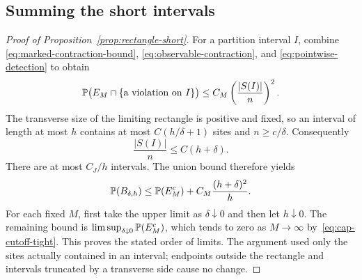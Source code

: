 \subsection{Summing the short intervals}

\begin{proof}[Proof of Proposition~\ref{prop:rectangle-short}]
For a partition interval $I$, combine
\eqref{eq:marked-contraction-bound},
\eqref{eq:observable-contraction}, and
\eqref{eq:pointwise-detection} to obtain
\[
 \mathbb P\bigl(E_M\cap\{\text{a violation on }I\}\bigr)
 \le C_M\left(\frac{|S(I)|}{n}\right)^2.
\]
The transverse size of the limiting rectangle is positive and fixed,
so an interval of length at most $h$ contains at most $C(h/\delta+1)$
sites and $n\ge c/\delta$.  Consequently
\[
 \frac{|S(I)|}{n}\le C(h+\delta).
\]
There are at most $C_J/h$ intervals.  The union bound therefore yields
\begin{equation}
 \mathbb P(B_{\delta,h})
 \le\mathbb P(E_M^c)+C_M\frac{(h+\delta)^2}{h}.
 \label{eq:short-union-bound}
\end{equation}
For each fixed $M$, first take the upper limit as $\delta\downarrow0$
and then let $h\downarrow0$.  The remaining bound is
$\limsup_{\delta\downarrow0}\mathbb P(E_M^c)$, which tends to zero as
$M\to\infty$ by~\eqref{eq:cap-cutoff-tight}.  This proves the stated
order of limits.  The argument used only the sites actually contained
in an interval; endpoints outside the rectangle and intervals
truncated by a transverse side cause no change.
\end{proof}
